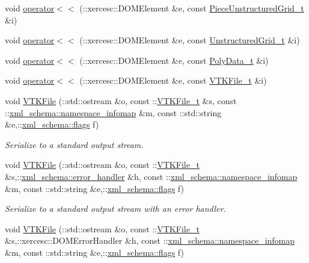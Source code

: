 \begin{DoxyCompactItemize}
\item 
void \hyperlink{vtk-unstructured_8cpp_a145ab456a0b4837b55ff6755514fd7d4}{operator$<$$<$} (\-::xercesc\-::\-D\-O\-M\-Element \&e, const \hyperlink{classPieceUnstructuredGrid__t}{Piece\-Unstructured\-Grid\-\_\-t} \&i)
\item 
void \hyperlink{vtk-unstructured_8cpp_a53b72fe6aa7e7f479b37e10e807fe4f4}{operator$<$$<$} (\-::xercesc\-::\-D\-O\-M\-Element \&e, const \hyperlink{classUnstructuredGrid__t}{Unstructured\-Grid\-\_\-t} \&i)
\item 
void \hyperlink{vtk-unstructured_8cpp_abece001f0a506ac3847ede9a0a72d81d}{operator$<$$<$} (\-::xercesc\-::\-D\-O\-M\-Element \&e, const \hyperlink{classPolyData__t}{Poly\-Data\-\_\-t} \&i)
\item 
void \hyperlink{vtk-unstructured_8cpp_ac655f285f1cdc6fc044b7d58a7596a6a}{operator$<$$<$} (\-::xercesc\-::\-D\-O\-M\-Element \&e, const \hyperlink{classVTKFile__t}{V\-T\-K\-File\-\_\-t} \&i)
\item 
void \hyperlink{vtk-unstructured_8cpp_a60fc47cfc610f6c31dfd3b0c12892e49}{V\-T\-K\-File} (\-::std\-::ostream \&o, const \-::\hyperlink{classVTKFile__t}{V\-T\-K\-File\-\_\-t} \&s, const \-::\hyperlink{namespacexml__schema_ad52b6e3505153cb30ba3452f7868450e}{xml\-\_\-schema\-::namespace\-\_\-infomap} \&m, const \-::std\-::string \&e,\-::\hyperlink{namespacexml__schema_a8d981c127a1f5106d04ad5853e707361}{xml\-\_\-schema\-::flags} f)
\begin{DoxyCompactList}\small\item\em Serialize to a standard output stream. \end{DoxyCompactList}\item 
void \hyperlink{vtk-unstructured_8cpp_abe499904eca404dadf8429281c88a3a2}{V\-T\-K\-File} (\-::std\-::ostream \&o, const \-::\hyperlink{classVTKFile__t}{V\-T\-K\-File\-\_\-t} \&s,\-::\hyperlink{namespacexml__schema_abdee01986b8e16f04af47dd12038261e}{xml\-\_\-schema\-::error\-\_\-handler} \&h, const \-::\hyperlink{namespacexml__schema_ad52b6e3505153cb30ba3452f7868450e}{xml\-\_\-schema\-::namespace\-\_\-infomap} \&m, const \-::std\-::string \&e,\-::\hyperlink{namespacexml__schema_a8d981c127a1f5106d04ad5853e707361}{xml\-\_\-schema\-::flags} f)
\begin{DoxyCompactList}\small\item\em Serialize to a standard output stream with an error handler. \end{DoxyCompactList}\item 
void \hyperlink{vtk-unstructured_8cpp_af6a299b24ebe8c1465bc6164376a10bc}{V\-T\-K\-File} (\-::std\-::ostream \&o, const \-::\hyperlink{classVTKFile__t}{V\-T\-K\-File\-\_\-t} \&s,\-::xercesc\-::\-D\-O\-M\-Error\-Handler \&h, const \-::\hyperlink{namespacexml__schema_ad52b6e3505153cb30ba3452f7868450e}{xml\-\_\-schema\-::namespace\-\_\-infomap} \&m, const \-::std\-::string \&e,\-::\hyperlink{namespacexml__schema_a8d981c127a1f5106d04ad5853e707361}{xml\-\_\-schema\-::flags} f)

\end{DoxyCompactItemize}

